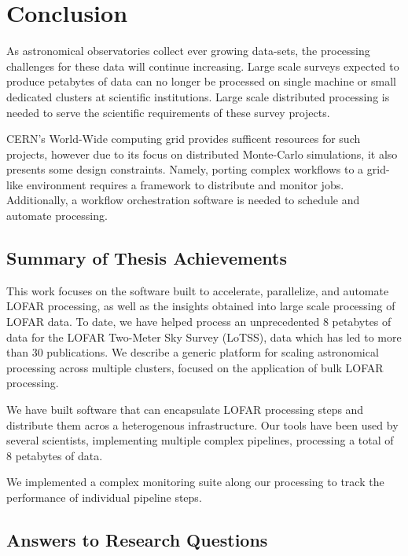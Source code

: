 \chapter{Conclusion}

\label{ch:conclusions}

As astronomical observatories collect ever growing data-sets, the processing challenges for these data will continue increasing. Large scale surveys expected to produce petabytes of data can no longer be processed on single machine or small dedicated clusters at scientific institutions. Large scale distributed processing is needed to serve the scientific requirements of these survey projects. 

CERN's World-Wide computing grid provides sufficent resources for such projects, however due to its focus on distributed Monte-Carlo simulations, it also presents some design constraints. Namely, porting complex workflows to a grid-like environment requires a framework to distribute and monitor jobs. Additionally, a workflow orchestration software is needed to schedule and automate processing. 

\section{Summary of Thesis Achievements}

This work focuses on the software built to accelerate, parallelize, and automate LOFAR processing,  as well as the insights obtained into large scale processing of LOFAR data. To date, we have helped process an unprecedented 8 petabytes of data for the LOFAR Two-Meter Sky Survey (LoTSS), data which has led to  more than 30 publications. We describe a generic platform for scaling astronomical processing across multiple clusters, focused on the  application of bulk LOFAR processing.  

We have built software that can encapsulate LOFAR processing steps and distribute them acros a heterogenous infrastructure. Our tools have been used by several scientists, implementing multiple complex pipelines, processing a total of 8 petabytes of data. 

We implemented a complex monitoring suite along our processing to track the performance of individual pipeline steps. 

\section{Answers to Research Questions}


